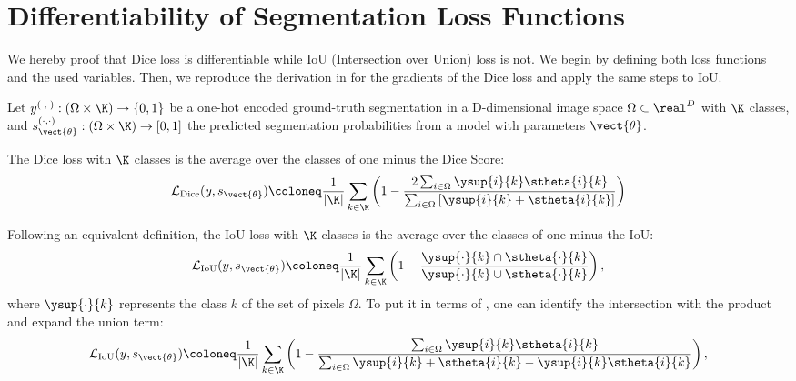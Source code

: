 \section{Differentiability of Segmentation Loss Functions}\label{app:iou}


We hereby proof that Dice loss is differentiable while IoU (Intersection over Union) loss is not. We begin by defining both loss functions and the used variables. Then, we reproduce the derivation in  for the gradients of the Dice loss and apply the same steps to IoU.

Let $y^{(\cdot,\cdot)}:(\Omega \times \K)\rightarrow\{0, 1\}$ be a one-hot encoded ground-truth segmentation in a D-dimensional image space $\Omega \subset \real^D$ with $\K$ classes, and $s^{(\cdot,\cdot)}_{\vect{\theta}}:(\Omega \times \K)\rightarrow[0, 1]$ the predicted segmentation probabilities from a model with parameters $\vect{\theta}$.

\begin{definition}
The Dice loss with $\K$ classes is the average over the classes of one minus the Dice Score:
\begin{equation}
    \mathcal{L}_\text{Dice}(y, s_{\vect{\theta}}) \coloneq \dfrac{1}{|\K|}\sum_{k\in\K}\left(1 - \dfrac{2\sum_{i\in\Omega} \ysup{i}{k}\stheta{i}{k}}{\sum_{i\in\Omega}\left[\ysup{i}{k} + \stheta{i}{k}\right]}\right)
    \label{eq:app_diceloss}
\end{equation}
\end{definition}

\begin{definition}
    Following an equivalent definition, the IoU loss with $\K$ classes is the average over the classes of one minus the IoU:
    \begin{equation*}
        \mathcal{L}_\text{IoU}(y, s_{\vect{\theta}}) \coloneq \dfrac{1}{|\K|}\sum_{k\in\K}\left(1 - \dfrac{\ysup{\cdot}{k}\cap\stheta{\cdot}{k}}{\ysup{\cdot}{k} \cup \stheta{\cdot}{k}}\right),
    \end{equation*}
    where $\ysup{\cdot}{k}$ represents the class $k$ of the set of pixels $\Omega$. To put it in terms of , one can identify the intersection with the product and expand the union term:
    \begin{equation*}
        \mathcal{L}_\text{IoU}(y, s_{\vect{\theta}}) \coloneq \dfrac{1}{|\K|}\sum_{k\in\K}\left(1 - \dfrac{\sum_{i\in\Omega}\ysup{i}{k}\stheta{i}{k}}{\sum_{i\in\Omega}\ysup{i}{k} + \stheta{i}{k} - \ysup{i}{k}\stheta{i}{k}}\right),
    \end{equation*}
\end{definition}

